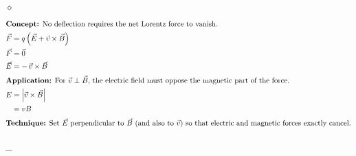\documentclass[preview, border={10mm, 5mm, 10mm, 10mm}]{standalone}
\newenvironment{idea}{\par\noindent\color{violet!80!black}$\diamond$\enspace\ignorespaces}{\par}
\begin{document}
\begin{enumerate}[leftmargin=*]
\begin{idea}
    \begin{align*}
    \intertext{\textbf{Concept:} No deflection requires the net Lorentz force to vanish.}
    \vec{F} &= q\left(\vec{E}+\vec{v}\times\vec{B}\right) \\
    \vec{F} &= \vec{0} \\
    \vec{E} &= -\,\vec{v}\times\vec{B} \\
    \intertext{\textbf{Application:} For $\vec{v}\perp\vec{B}$, the electric field must oppose the magnetic part of the force.}
    E &= \left|\vec{v}\times\vec{B}\right| \\
    &= vB \\
    \intertext{\textbf{Technique:} Set $\vec{E}$ perpendicular to $\vec{B}$ (and also to $\vec{v}$) so that electric and magnetic forces exactly cancel.}
    \end{align*}
\end{idea}
\end{enumerate}
\hfill $\_\_$
\end{document}
